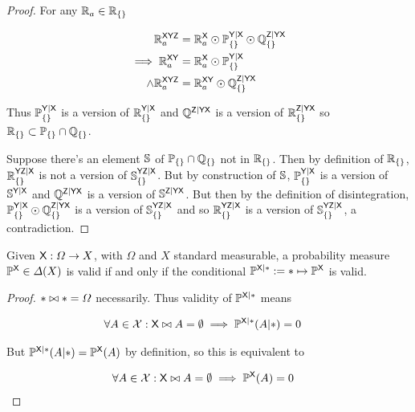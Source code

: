 \begin{proof}
For any $\mathbb{R}_a\in\mathbb{R}_{\{\}}$

\begin{align}
    \mathbb{R}_{a}^{\mathsf{XYZ}} &= \mathbb{R}_a^{\mathsf{X}}\odot \mathbb{P}_{\{\}}^{\mathsf{Y}|\mathsf{X}}\odot \mathbb{Q}_{\{\}}^{\mathsf{Z}|\mathsf{YX}}\\
    \implies \mathbb{R}_{a}^{\mathsf{XY}} &= \mathbb{R}_a^{\mathsf{X}}\odot \mathbb{P}_{\{\}}^{\mathsf{Y}|\mathsf{X}}\\
    \land \mathbb{R}_{a}^{\mathsf{XYZ}} &= \mathbb{R}_{a}^{\mathsf{XY}}\odot \mathbb{Q}_{\{\}}^{\mathsf{Z}|\mathsf{YX}}
\end{align}

Thus $\mathbb{P}_{\{\}}^{\mathsf{Y}|\mathsf{X}}$ is a version of $\mathbb{R}_{\{\}}^{\mathsf{Y}|\mathsf{X}}$ and $\mathbb{Q}^{\mathsf{Z}|\mathsf{YX}}$ is a version of $\mathbb{R}_{\{\}}^{\mathsf{Z}|\mathsf{YX}}$ so $\mathbb{R}_{\{\}}\subset \mathbb{P}_{\{\}}\cap\mathbb{Q}_{\{\}}$.

Suppose there's an element $\mathbb{S}$ of $\mathbb{P}_{\{\}}\cap\mathbb{Q}_{\{\}}$ not in $\mathbb{R}_{\{\}}$. Then by definition of $\mathbb{R}_{\{\}}$, $\mathbb{R}_{\{\}}^{\mathsf{YZ}|\mathsf{X}}$ is not a version of $\mathbb{S}_{\{\}}^{\mathsf{YZ}|\mathsf{X}}$. But by construction of $\mathbb{S}$, $\mathbb{P}_{\{\}}^{\mathsf{Y}|\mathsf{X}}$  is a version of $\mathbb{S}^{\mathsf{Y}|\mathsf{X}}$ and  $\mathbb{Q}^{\mathsf{Z}|\mathsf{YX}}$ is a version of $\mathbb{S}^{\mathsf{Z}|\mathsf{YX}}$. But then by the definition of disintegration, $\mathbb{P}_{\{\}}^{\mathsf{Y}|\mathsf{X}} \odot \mathbb{Q}_{\{\}}^{\mathsf{Z}|\mathsf{YX}}$ is a version of $\mathbb{S}_{\{\}}^{\mathsf{YZ}|\mathsf{X}}$ and so $\mathbb{R}_{\{\}}^{\mathsf{YZ}|\mathsf{X}}$ is a version of $\mathbb{S}_{\{\}}^{\mathsf{YZ}|\mathsf{X}}$, a contradiction.
\end{proof}


\begin{lemma}\label{th:valid_agree}
Given $\mathsf{X}:\Omega\to X$, with $\Omega$ and $X$ standard measurable, a probability measure $\mathbb{P}^{\mathsf{X}}\in \Delta(X)$ is valid if and only if the conditional $\mathbb{P}^{\mathsf{X}|*}:=*\mapsto \mathbb{P}^{\mathsf{X}}$ is valid.
\end{lemma}

\begin{proof}
$*\bowtie *=\Omega$ necessarily. Thus validity of $\mathbb{P}^{\mathsf{X}|*}$ means 

\begin{align}
    \forall A\in \mathcal{X}: \mathsf{X}\bowtie A=\emptyset \implies \mathbb{P}^{\mathsf{X}|*}(A|*)&=0
\end{align}

But $\mathbb{P}^{\mathsf{X}|*}(A|*)=\mathbb{P}^{\mathsf{X}}(A)$ by definition, so this is equivalent to

\begin{align}
    \forall A\in \mathcal{X}: \mathsf{X}\bowtie A=\emptyset \implies \mathbb{P}^{\mathsf{X}}(A)&=0
\end{align}
\end{proof}


